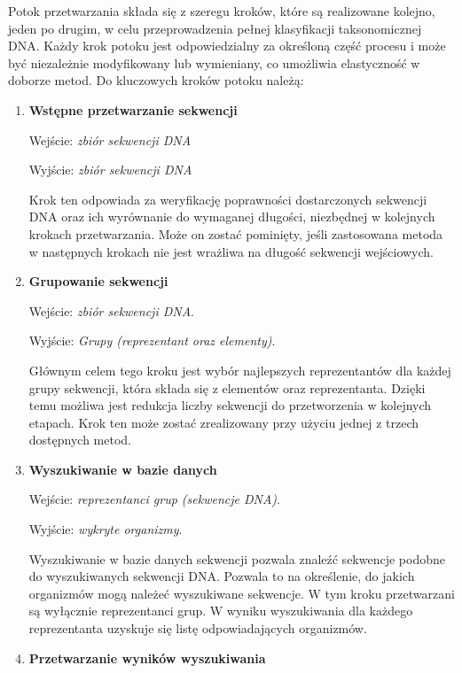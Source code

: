             Potok przetwarzania składa się z szeregu kroków, które są realizowane kolejno, jeden po drugim, w celu przeprowadzenia pełnej klasyfikacji taksonomicznej DNA. Każdy krok potoku jest odpowiedzialny za określoną część procesu i może być niezależnie modyfikowany lub wymieniany, co umożliwia elastyczność w doborze metod.
            Do kluczowych kroków potoku należą:

            \begin{enumerate}
                \item {
                    \textbf{Wstępne przetwarzanie sekwencji}

                    Wejście: \textit{zbiór sekwencji DNA}

                    Wyjście: \textit{zbiór sekwencji DNA}

                    Krok ten odpowiada za weryfikację poprawności dostarczonych sekwencji DNA oraz ich wyrównanie do wymaganej długości, niezbędnej w kolejnych krokach przetwarzania. Może on zostać pominięty, jeśli zastosowana metoda w następnych krokach nie jest wrażliwa na długość sekwencji wejściowych.
                }
                \item {
                    \textbf{Grupowanie sekwencji}

                    Wejście: \textit{zbiór sekwencji DNA}.

                    Wyjście: \textit{Grupy (reprezentant oraz elementy)}.

                    Głównym celem tego kroku jest wybór najlepszych reprezentantów dla każdej grupy sekwencji, która składa się z elementów oraz reprezentanta. Dzięki temu możliwa jest redukcja liczby sekwencji do przetworzenia w kolejnych etapach. Krok ten może zostać zrealizowany przy użyciu jednej z trzech dostępnych metod.
                }
                \item {
                    \textbf{Wyszukiwanie w bazie danych}

                    Wejście: \textit{reprezentanci grup (sekwencje DNA)}.

                    Wyjście: \textit{wykryte organizmy}.

                    Wyszukiwanie w bazie danych sekwencji pozwala znaleźć sekwencje podobne do wyszukiwanych sekwencji DNA. Pozwala to na określenie, do jakich organizmów mogą należeć wyszukiwane sekwencje. W tym kroku przetwarzani są wyłącznie reprezentanci grup. W wyniku wyszukiwania dla każdego reprezentanta uzyskuje się listę odpowiadających organizmów.
                }
                \item {
                    \textbf{Przetwarzanie wyników wyszukiwania}

}
\end{enumerate}
